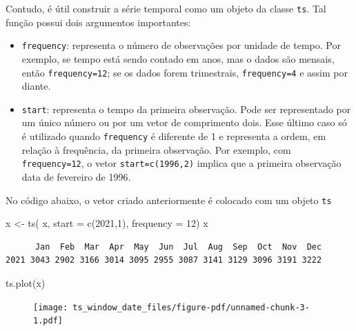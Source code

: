 \documentclass[
  letterpaper,
  DIV=11,
  numbers=noendperiod]{scrreprt}
\newenvironment{Shaded}{\begin{snugshade}}{\end{snugshade}}
\newcommand{\AttributeTok}[1]{\textcolor[rgb]{0.40,0.45,0.13}{#1}}
\newcommand{\DecValTok}[1]{\textcolor[rgb]{0.68,0.00,0.00}{#1}}
\newcommand{\FunctionTok}[1]{\textcolor[rgb]{0.28,0.35,0.67}{#1}}
\newcommand{\NormalTok}[1]{\textcolor[rgb]{0.00,0.23,0.31}{#1}}
\newcommand{\OtherTok}[1]{\textcolor[rgb]{0.00,0.23,0.31}{#1}}
\theoremstyle{definition}
\theoremstyle{plain}
\theoremstyle{definition}
\theoremstyle{plain}
\theoremstyle{remark}
\begin{document}
Contudo, é útil construir a série temporal como um objeto da classe
\texttt{ts}. Tal função possui dois argumentos importantes:

\begin{itemize}
\item
  \texttt{frequency}: representa o número de observações por unidade de
  tempo. Por exemplo, se tempo está sendo contado em anos, mas o dados
  são mensais, então \texttt{frequency=12}; se os dados forem
  trimestrais, \texttt{frequency=4} e assim por diante.
\item
  \texttt{start}: representa o tempo da primeira observação. Pode ser
  representado por um único número ou por um vetor de comprimento dois.
  Esse último caso só é utilizado quando \texttt{frequency} é diferente
  de 1 e representa a ordem, em relação à frequência, da primeira
  observação. Por exemplo, com \texttt{frequency=12}, o vetor
  \texttt{start=c(1996,2)} implica que a primeira observação data de
  fevereiro de 1996.
\end{itemize}

No código abaixo, o vetor criado anteriormente é colocado com um objeto
\texttt{ts}

\begin{Shaded}
\begin{Highlighting}[]
\NormalTok{x }\OtherTok{\textless{}{-}} \FunctionTok{ts}\NormalTok{( x, }\AttributeTok{start =} \FunctionTok{c}\NormalTok{(}\DecValTok{2021}\NormalTok{,}\DecValTok{1}\NormalTok{), }\AttributeTok{frequency =} \DecValTok{12}\NormalTok{)}
\NormalTok{x}
\end{Highlighting}
\end{Shaded}

\begin{verbatim}
      Jan  Feb  Mar  Apr  May  Jun  Jul  Aug  Sep  Oct  Nov  Dec
2021 3043 2902 3166 3014 3095 2955 3087 3141 3129 3096 3191 3222
\end{verbatim}

\begin{Shaded}
\begin{Highlighting}[]
\FunctionTok{ts.plot}\NormalTok{(x)}
\end{Highlighting}
\end{Shaded}

\begin{figure}[H]

{\centering \texttt{[image: ts\_window\_date\_files/figure-pdf/unnamed-chunk-3-1.pdf]}

}

\end{figure}
\end{document}
